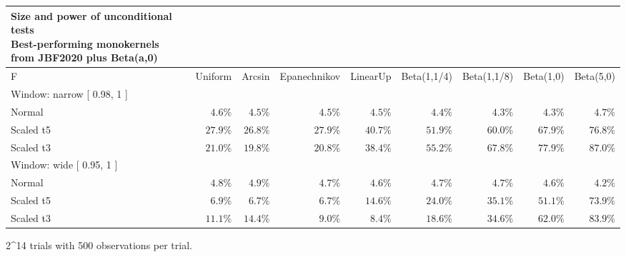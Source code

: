 \setlength{\LTpost}{0mm}
\begin{longtable}{lrrrrrrrr}
\caption*{
{\large Size and power of unconditional tests} \\ 
{\small Best-performing monokernels from JBF2020 plus Beta(a,0)}
} \\ 
\toprule
F & Uniform & Arcsin & Epanechnikov & LinearUp & Beta(1,1/4) & Beta(1,1/8) & Beta(1,0) & Beta(5,0) \\ 
\midrule
\multicolumn{9}{l}{Window:  narrow  [ 0.98, 1 ]} \\ 
\midrule
Normal & $4.6\%$ & $4.5\%$ & $4.5\%$ & $4.5\%$ & $4.4\%$ & $4.3\%$ & $4.3\%$ & $4.7\%$ \\ 
Scaled t5 & $27.9\%$ & $26.8\%$ & $27.9\%$ & $40.7\%$ & $51.9\%$ & $60.0\%$ & $67.9\%$ & $76.8\%$ \\ 
Scaled t3 & $21.0\%$ & $19.8\%$ & $20.8\%$ & $38.4\%$ & $55.2\%$ & $67.8\%$ & $77.9\%$ & $87.0\%$ \\ 
\midrule
\multicolumn{9}{l}{Window:  wide  [ 0.95, 1 ]} \\ 
\midrule
Normal & $4.8\%$ & $4.9\%$ & $4.7\%$ & $4.6\%$ & $4.7\%$ & $4.7\%$ & $4.6\%$ & $4.2\%$ \\ 
Scaled t5 & $6.9\%$ & $6.7\%$ & $6.7\%$ & $14.6\%$ & $24.0\%$ & $35.1\%$ & $51.1\%$ & $73.9\%$ \\ 
Scaled t3 & $11.1\%$ & $14.4\%$ & $9.0\%$ & $8.4\%$ & $18.6\%$ & $34.6\%$ & $62.0\%$ & $83.9\%$ \\ 
\bottomrule
\end{longtable}
\begin{minipage}{\linewidth}
2\textasciicircum{}14 trials with 500 observations per trial.\\
\end{minipage}

